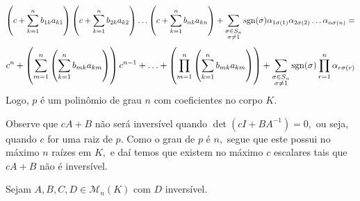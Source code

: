 \documentclass[11pt,a4paper]{article}
\begin{document}
{\[\]
\[
\left( c + \sum\limits_{k = 1}^n b_{1k}a_{k1} \right)\left( c + \sum\limits_{k = 1}^n b_{2k}a_{k2} \right)\ldots\left( c + \sum\limits_{k = 1}^n b_{nk}a_{kn} \right) + \sum\limits_{\substack{\sigma \in S_n \\ \sigma \neq 1}} {\rm sgn}(\sigma) \alpha_{1\sigma(1)}\alpha_{2\sigma(2)} \ldots \alpha_{n \sigma(n)} = \]\[c^n + \left(  \sum\limits_{m = 1}^n  \left(\sum\limits_{k = 1}^n b_{mk}a_{km}\right) \right)c^{n-1} + \ldots +  \left(  \prod\limits_{m = 1}^n  \left(\sum\limits_{k = 1}^n b_{mk}a_{km}\right)\right) + \sum\limits_{\substack{\sigma \in S_n \\ \sigma \neq 1}} {\rm sgn}(\sigma) \prod\limits_{r = 1}^n \alpha_{r\sigma(r)}
\]
Logo, $p$ é um polinômio de grau $n$ com coeficientes no corpo $K.$ 

Observe que $cA + B$ não será inversível quando $\det(cI + BA^{-1}) = 0,$ ou seja, quando $c$ for uma raiz de $p.$ Como o grau de $p$ é $n,$ segue que este possui no máximo $n$ raízes em $K,$ e daí temos que existem no máximo $c$ escalares tais que $cA + B$ não é inversível.
}

 Sejam $A, B, C, D\in \mathcal{M}_n(K)$ com $D$ inversível.

\end{document}
